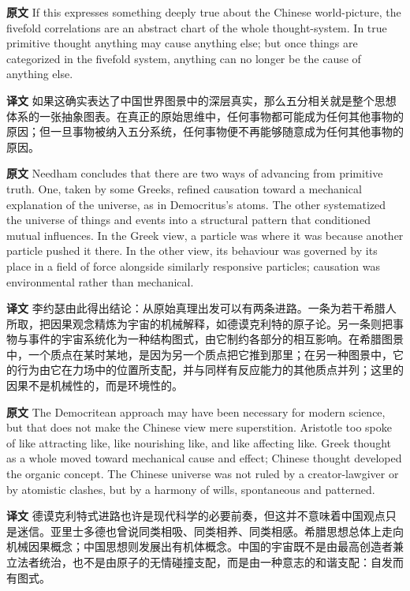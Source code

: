 \documentclass[UTF8,zihao=-4]{ctexart}
\newcommand{\BodyFont}{\fontsize{10.5pt}{15.5pt}\selectfont}
\newcommand{\origlabel}{\textbf{原文}\quad}
\newcommand{\translabel}{\textbf{译文}\quad}
\newenvironment{enblock}{\par\noindent\begingroup\BodyFont\origlabel}{\par\endgroup}
\newenvironment{zhblock}{\par\noindent\begingroup\BodyFont\translabel}{\par\endgroup\vspace{0.35em}}
\begin{document}
\begin{enblock}
If this expresses something deeply true about the Chinese world-picture, the fivefold correlations are an abstract chart of the whole thought-system. In true primitive thought anything may cause anything else; but once things are categorized in the fivefold system, anything can no longer be the cause of anything else.
\end{enblock}
\begin{zhblock}
如果这确实表达了中国世界图景中的深层真实，那么五分相关就是整个思想体系的一张抽象图表。在真正的原始思维中，任何事物都可能成为任何其他事物的原因；但一旦事物被纳入五分系统，任何事物便不再能够随意成为任何其他事物的原因。
\end{zhblock}

\begin{enblock}
Needham concludes that there are two ways of advancing from primitive truth. One, taken by some Greeks, refined causation toward a mechanical explanation of the universe, as in Democritus's atoms. The other systematized the universe of things and events into a structural pattern that conditioned mutual influences. In the Greek view, a particle was where it was because another particle pushed it there. In the other view, its behaviour was governed by its place in a field of force alongside similarly responsive particles; causation was environmental rather than mechanical.
\end{enblock}
\begin{zhblock}
李约瑟由此得出结论：从原始真理出发可以有两条进路。一条为若干希腊人所取，把因果观念精炼为宇宙的机械解释，如德谟克利特的原子论。另一条则把事物与事件的宇宙系统化为一种结构图式，由它制约各部分的相互影响。在希腊图景中，一个质点在某时某地，是因为另一个质点把它推到那里；在另一种图景中，它的行为由它在力场中的位置所支配，并与同样有反应能力的其他质点并列；这里的因果不是机械性的，而是环境性的。
\end{zhblock}

\begin{enblock}
The Democritean approach may have been necessary for modern science, but that does not make the Chinese view mere superstition. Aristotle too spoke of like attracting like, like nourishing like, and like affecting like. Greek thought as a whole moved toward mechanical cause and effect; Chinese thought developed the organic concept. The Chinese universe was not ruled by a creator-lawgiver or by atomistic clashes, but by a harmony of wills, spontaneous and patterned.
\end{enblock}
\begin{zhblock}
德谟克利特式进路也许是现代科学的必要前奏，但这并不意味着中国观点只是迷信。亚里士多德也曾说同类相吸、同类相养、同类相感。希腊思想总体上走向机械因果概念；中国思想则发展出有机体概念。中国的宇宙既不是由最高创造者兼立法者统治，也不是由原子的无情碰撞支配，而是由一种意志的和谐支配：自发而有图式。
\end{zhblock}
\end{document}
